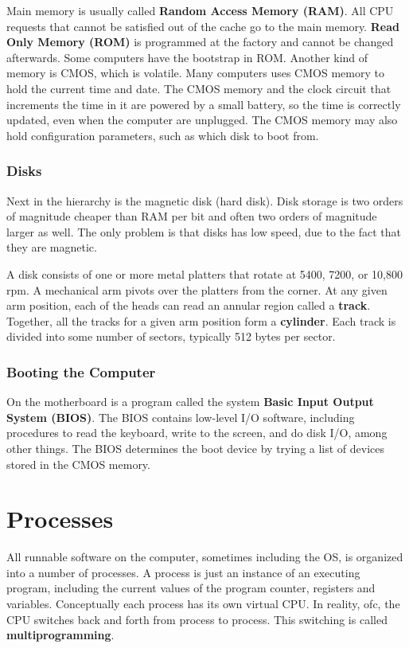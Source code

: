 \documentclass[11pt,a4paper]{article}
\begin{document}
Main memory is usually called \textbf{Random Access Memory (RAM)}. All CPU requests that cannot be satisfied out of the cache go to the main memory. \textbf{Read Only Memory (ROM)} is programmed at the factory and cannot be changed afterwards. Some computers have the bootstrap in ROM.
Another kind of memory is CMOS, which is volatile. Many computers uses CMOS memory to hold the current time and date. The CMOS memory and the clock circuit that increments the time in it are powered by a small battery, so the time is correctly updated, even when the computer are unplugged. The CMOS memory may also hold configuration parameters, such as which disk to boot from.

\subsubsection{Disks}
Next in the hierarchy is the magnetic disk (hard disk). Disk storage is two orders of magnitude cheaper than RAM per bit and often two orders of magnitude larger as well. The only problem is that disks has low speed, due to the fact that they are magnetic.

A disk consists of one or more metal platters that rotate at 5400, 7200, or 10,800 rpm. A mechanical arm pivots over the platters from the corner. At any given arm position, each of the heads can read an annular region called a \textbf{track}. Together, all the tracks for a given arm position form a \textbf{cylinder}. Each track is divided into some number of sectors, typically 512 bytes per sector.

\subsubsection{Booting the Computer}
On the motherboard is a program called the system \textbf{Basic Input Output System (BIOS)}. The BIOS contains low-level I/O software, including procedures to read the keyboard, write to the screen, and do disk I/O, among other things. The BIOS determines the boot device by trying a list of devices stored in the CMOS memory.

\section{Processes}
All runnable software on the computer, sometimes including the OS, is organized into a number of processes. A process is just an instance of an executing program, including the current values of the program counter, registers and variables. Conceptually each process has its own virtual CPU. In reality, ofc, the CPU switches back and forth from process to process. This switching is called \textbf{multiprogramming}.
\end{document}
